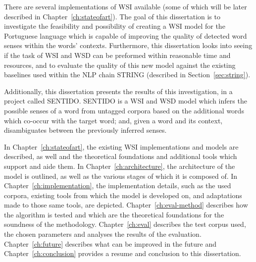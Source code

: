 
There are several implementations of \ac{WSI} available (some of which will be
later described in Chapter~\ref{ch:stateofart}). The goal of this dissertation
is to investigate the feasibility and possibility of creating a \ac{WSI} model
for the Portuguese language which is capable of improving the quality of
detected word senses within the words' contexts. Furthermore, this dissertation
looks into seeing if the task of \ac{WSI} and \ac{WSD} can be preformed within
reasonable time and resources, and to evaluate the quality of this new model
against the existing baselines used within the \ac{NLP} chain \acs*{STRING}
(described in Section~\ref{sec:string}).


Additionally, this dissertation presents the results of this investigation, in
a project called \ac{SENTIDO}. \ac{SENTIDO} is a \ac{WSI} and \ac{WSD} model
which infers the possible senses of a word from untagged corpora based on the
additional words which co-occur with the target word; and, given a word and its
context, disambiguates between the previously inferred senses.


In Chapter~\ref{ch:stateofart}, the existing \ac{WSI} implementations and models
are described, as well and the theoretical foundations and additional tools
which support and aide them. In Chapter~\ref{ch:architecture}, the architecture
of the model is outlined, as well as the various stages of which it is composed
of. In Chapter~\ref{ch:implementation}, the implementation details, such as the
used corpora, existing tools from which the model is developed on, and
adaptations made to those same tools, are depicted.
Chapter~\ref{ch:eval-method} describes how the algorithm is tested and which are
the theoretical foundations for the soundness of the methodology.
Chapter~\ref{ch:eval} describes the test corpus used, the chosen parameters and
analyses the results of the evaluation. Chapter~\ref{ch:future} describes what
can be improved in the future and Chapter~\ref{ch:conclusion} provides a
resume and conclusion to this dissertation.

